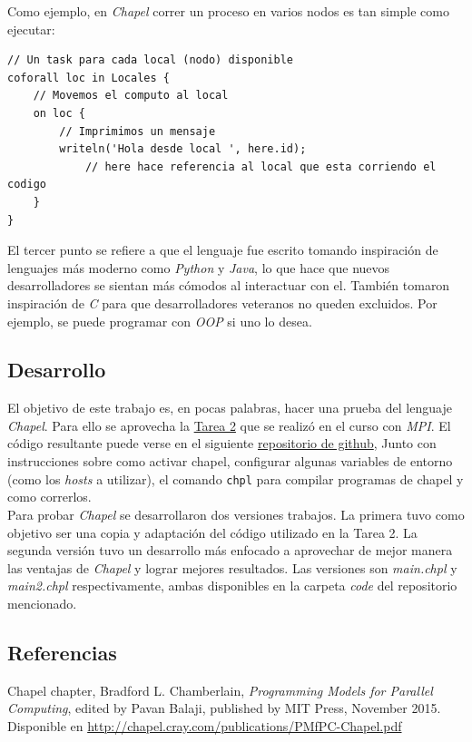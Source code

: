 \documentclass[10pt]{extarticle}
\begin{document}
Como ejemplo, en \textit{Chapel} correr un proceso en varios nodos es tan simple como ejecutar:

\begin{lstlisting}[language=Chapel]
// Un task para cada local (nodo) disponible
coforall loc in Locales {
	// Movemos el computo al local
	on loc {
		// Imprimimos un mensaje
		writeln('Hola desde local ', here.id);
			// here hace referencia al local que esta corriendo el codigo
	}
}
\end{lstlisting}

El tercer punto se refiere a que el lenguaje fue escrito tomando inspiración de lenguajes más moderno como \textit{Python} y \textit{Java}, lo que hace que nuevos desarrolladores se sientan más cómodos al interactuar con el. También tomaron inspiración de \textit{C} para que desarrolladores veteranos no queden excluidos. Por ejemplo, se puede programar con \textit{OOP} si uno lo desea.

\subsection*{Desarrollo}
El objetivo de este trabajo es, en pocas palabras, hacer una prueba del lenguaje \textit{Chapel}. Para ello se aprovecha la \href{https://github.com/negebauer/IIC3524-T2}{\color{blue!60}Tarea 2} que se realizó en el curso con \textit{MPI}. El código resultante puede verse en el siguiente \href{https://github.com/negebauer/IIC3524-Investigacion}{\color{blue!60}repositorio de github}, Junto con instrucciones sobre como activar chapel, configurar algunas variables de entorno (como los \textit{hosts} a utilizar), el comando \verb|chpl| para compilar programas de chapel y como correrlos.\\

Para probar \textit{Chapel} se desarrollaron dos versiones trabajos. La primera tuvo como objetivo ser una copia y adaptación del código utilizado en la Tarea 2. La segunda versión tuvo un desarrollo más enfocado a aprovechar de mejor manera las ventajas de \textit{Chapel} y lograr mejores resultados. Las versiones son \textit{main.chpl} y \textit{main2.chpl} respectivamente, ambas disponibles en la carpeta \textit{code} del repositorio mencionado.\\



\subsection*{Referencias}
Chapel chapter, Bradford L. Chamberlain, \textit{Programming Models for Parallel Computing}, edited by Pavan Balaji, published by MIT Press, November 2015. Disponible en \href{http://chapel.cray.com/publications/PMfPC-Chapel.pdf}{\color{blue!60}http://chapel.cray.com/publications/PMfPC-Chapel.pdf}

%
\end{document}
